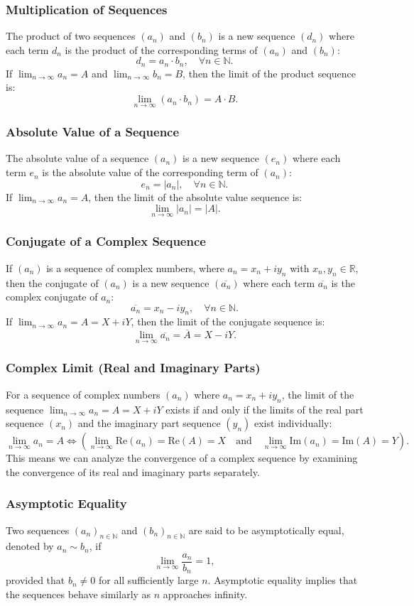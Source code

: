 \subsubsection{Multiplication of Sequences}
The product of two sequences \((a_n)\) and \((b_n)\) is a new sequence \((d_n)\) where each term \(d_n\) is the product of the corresponding terms of \((a_n)\) and \((b_n)\):
\[
d_n = a_n \cdot b_n, \quad \forall n \in \mathbb{N}.
\]
If \(\lim_{n \to \infty} a_n = A\) and \(\lim_{n \to \infty} b_n = B\), then the limit of the product sequence is:
\[
\lim_{n \to \infty} (a_n \cdot b_n) = A \cdot B.
\]

\subsubsection{Absolute Value of a Sequence}
The absolute value of a sequence \((a_n)\) is a new sequence \((e_n)\) where each term \(e_n\) is the absolute value of the corresponding term of \((a_n)\):
\[
e_n = |a_n|, \quad \forall n \in \mathbb{N}.
\]
If \(\lim_{n \to \infty} a_n = A\), then the limit of the absolute value sequence is:
\[
\lim_{n \to \infty} |a_n| = |A|.
\]

\subsubsection{Conjugate of a Complex Sequence}
If \((a_n)\) is a sequence of complex numbers, where \(a_n = x_n + i y_n\) with \(x_n, y_n \in \mathbb{R}\), then the conjugate of \((a_n)\) is a new sequence \((\overline{a_n})\) where each term \(\overline{a_n}\) is the complex conjugate of \(a_n\):
\[
\overline{a_n} = x_n - i y_n, \quad \forall n \in \mathbb{N}.
\]
If \(\lim_{n \to \infty} a_n = A = X + i Y\), then the limit of the conjugate sequence is:
\[
\lim_{n \to \infty} \overline{a_n} = \overline{A} = X - i Y.
\]

\subsubsection{Complex Limit (Real and Imaginary Parts)}
For a sequence of complex numbers \((a_n)\) where \(a_n = x_n + i y_n\), the limit of the sequence \(\lim_{n \to \infty} a_n = A = X + i Y\) exists if and only if the limits of the real part sequence \((x_n)\) and the imaginary part sequence \((y_n)\) exist individually:
\[
\lim_{n \to \infty} a_n = A \iff \left( \lim_{n \to \infty} \text{Re}(a_n) = \text{Re}(A) = X \quad \text{and} \quad \lim_{n \to \infty} \text{Im}(a_n) = \text{Im}(A) = Y \right).
\]
This means we can analyze the convergence of a complex sequence by examining the convergence of its real and imaginary parts separately.

\subsubsection{Asymptotic Equality}
Two sequences \({(a_n)}_{n \in \mathbb{N}}\) and \({(b_n)}_{n \in \mathbb{N}}\) are said to be asymptotically equal, denoted by \(a_n \sim b_n\), if
\[
\lim_{n \to \infty} \frac{a_n}{b_n} = 1,
\]
provided that \(b_n \neq 0\) for all sufficiently large \(n\). Asymptotic equality implies that the sequences behave similarly as \(n\) approaches infinity.

